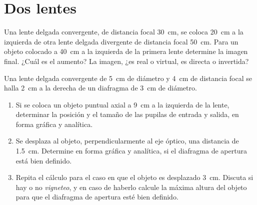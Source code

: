 \section*{Dos lentes}


\item Una lente delgada convergente, de distancia focal \SI{30}{\centi\metre}, se coloca \SI{20}{\centi\metre} a la izquierda de otra lente delgada divergente de distancia focal \SI{50}{\centi\metre}.
Para un objeto colocado a \SI{40}{\centi\metre} a la izquierda de la primera lente determine la imagen final.
¿Cuál es el aumento?
La imagen, ¿es real o virtual, es directa o invertida?



\item Una lente delgada convergente de \SI{5}{\centi\metre} de diámetro y \SI{4}{\centi\metre} de distancia focal se halla \SI{2}{\centi\metre} a la derecha de un diafragma de \SI{3}{\centi\metre} de diámetro.
\begin{enumerate}
	\item Si se coloca un objeto puntual axial a \SI{9}{\centi\metre} a la izquierda de la lente, determinar la posición y el tamaño de las pupilas de entrada y salida, en forma gráfica y analítica.
	\item Se desplaza al objeto, perpendicularmente al eje óptico, una distancia de \SI{1.5}{\centi\metre}.
Determine en forma gráfica y analítica, si el diafragma de apertura está bien definido.
	\item Repita el cálculo para el caso en que el objeto es desplazado \SI{3}{\centi\metre}. 
Discuta si hay o no \emph{vigneteo}, y en caso de haberlo calcule la máxima altura del objeto para que el diafragma de apertura esté bien definido.
\end{enumerate}
